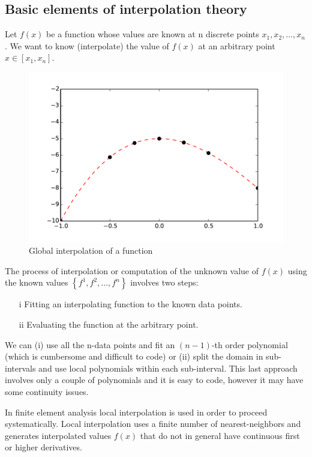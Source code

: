 \subsection{Basic elements of interpolation theory}
Let $f(x)$ be a function whose values are known at n discrete points ${x_1, x_2,...,x_n}$. We want to know (interpolate) the value of $f(x)$ at an arbitrary point $x \in \left[ {{x_1},{x_n}} \right]$.

\begin{figure}[h]
\centering
\includegraphics[width=12cm]{img/interpol1.pdf}
\caption{Global interpolation of a function}
\label{fig:interpol1}
\end{figure}

The process of interpolation or computation of the unknown value of $f(x)$ using the known values $\left\{ {{f^1},{f^2},...,{f^n}} \right\}$ involves two steps:

\begin{itemize}
\item[i]  Fitting an interpolating function to the known data points.
\item[ii] Evaluating the function at the arbitrary point.
\end{itemize}

We can (i) use all the n-data points and fit an $(n-1)$-th order polynomial (which is cumbersome and difficult to code) or (ii) split the domain in sub-intervals and use local polynomials within each sub-interval. This last approach involves only a couple of polynomials and it is easy to code, however it may have some continuity issues.

In finite element analysis local interpolation is used in order to proceed systematically. Local interpolation uses a finite number of nearest-neighbors and generates interpolated values $f(x)$ that do not in general have continuous first or higher derivatives.

